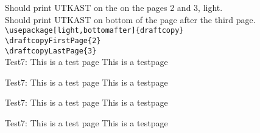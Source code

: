 \documentclass[a4paper,norsk]{article}
\newcommand{\xx}{
Test7: This is a test page \thepage \vfill
This is a testpage \thepage \newpage
}
\begin{document}
Should print UTKAST on the on the pages 2 and 3, light.\\
Should print UTKAST on bottom of the page after the third page.\\
\verb|\usepackage[light,bottomafter]{draftcopy}|\\
\verb|\draftcopyFirstPage{2}|\\
\verb|\draftcopyLastPage{3}|\\
\xx\xx\xx\xx
\end{document}
